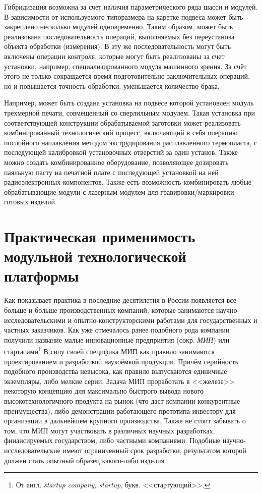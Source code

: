Гибридизация возможна за счет наличия параметрического ряда шасси и модулей. В зависимости от используемого типоразмера на каретке подвеса может быть закреплено несколько модулей одновременно. Таким образом, может быть реализована последовательность операций, выполняемых без переустанова объекта обработки (измерения). В эту же последовательность могут быть включены операции контроля, которые могут быть реализованы за счет установки, например, специализированного модуля машинного зрения. За счёт этого не только сокращается время подготовительно-заключительных операций, но и повышается точность обработки, уменьшается количество брака.

Например, может быть создана установка на подвесе которой установлен модуль трёхмерной печати, совмещенный со сверлильным модулем. Такая установка при соответствующей конструкции обрабатываемой заготовки может реализовать комбинированный технологический процесс, включающий в себя операцию послойного наплавления методом экструдирования расплавленного термопласта, с последующей калибровкой установочных отверстий за один установ. Также можно создать комбинированное оборудование, позволяющее дозировать паяльную пасту на печатной плате с последующей установкой на ней радиоэлектронных компонентов. Также есть возможность комбинировать любые обрабатывающие модули с лазерным модулем для гравировки/маркировки готовых изделий. 


\section{Практическая применимость модульной технологической платформы}

Как показывает практика в последние десятилетия в России появляется все больше и больше производственных компаний, которые занимаются научно-исследовательскими и опытно-конструкторскими работами для государственных и частных заказчиков. Как уже отмечалось ранее подобного рода компании получили название малые инновационные предприятия (сокр. \textit{МИП}) или стартапами\footnote{От англ. \textit{startup company, startup}, букв. <<стартующий>>.} В силу своей специфика МИП как правило занимаются проектированием и разработкой наукоёмкой продукции. Причём серийность подобного производства невысока, как правило выпускаются единичные экземпляры, либо мелкие серии. Задача МИП проработать в <<железе>> некоторую концепцию для максимально быстрого вывода нового высокотехнологичного продукта на рынок (что даст компании конкурентные преимущества), либо демонстрации работающего прототипа инвестору для организации в дальнейшем крупного производства. Также не стоит забывать о том, что МИП могут участвовать в различных научных разработках, финансируемых государством, либо частными компаниями. Подобные научно-исследовательские имеют ограниченный срок разработки, результатом которой должен стать опытный образец какого-либо изделия.

